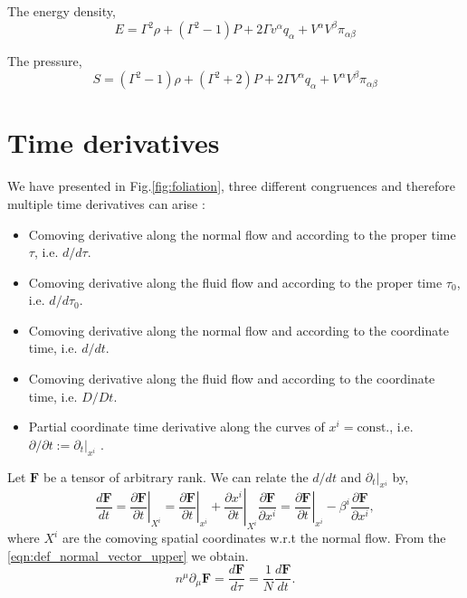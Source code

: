 The energy density,
\begin{equation}
    E=\Gamma^2 \rho + (\Gamma^2-1)P+2\Gamma v^\alpha q_\alpha + V^\alpha V^\beta \pi_{\alpha\beta}
    \label{eqn:general_energy_fluid_normal}
\end{equation}

The pressure,
\begin{equation}
    S=(\Gamma^2-1)\rho + (\Gamma^2+2)P+2\Gamma V^\alpha q_\alpha + V^\alpha V^\beta \pi_{\alpha\beta}
    \label{eqn:general_shear_fluid_normal}
\end{equation}




\section{Time derivatives}


We have presented in Fig.\eqref{fig:foliation}, three different congruences and therefore multiple time derivatives can arise \cite{Buchert_2020}:
\begin{itemize}
    \item Comoving derivative along the normal flow and according to the proper time $\tau$, i.e. $d/d\tau$.
    \item Comoving derivative along the fluid flow and according to the proper time $\tau_0$, i.e. $d/d\tau_0$.
    \item Comoving derivative along the normal flow and according to the coordinate time, i.e. $d/dt$.
    \item Comoving derivative along the fluid flow and according to the coordinate time, i.e. $D/Dt$.
    \item Partial coordinate time derivative along the curves of $x^i=\text{const.}$, i.e. $\partial/\partial t:=\partial_t|_{x^i}$ .
\end{itemize}

Let $\mathbf{F}$ be a tensor of arbitrary rank. We can relate the $d/dt$ and $\partial_t|_{x^i}$ by,
\begin{equation}
    \frac{d\mathbf{F}}{dt}=\left.\frac{\partial \mathbf{F}}{\partial t}\right|_{X^i}=\left.\frac{\partial \mathbf{F}}{\partial t}\right|_{x^i}+\left.\frac{\partial x^i}{\partial t}\right|_{X^i}\frac{\partial \mathbf{F}}{\partial x^i}=\left.\frac{\partial \mathbf{F}}{\partial t}\right|_{x^i}-\beta^i\frac{\partial \mathbf{F}}{\partial x^i},
    \label{eqn:normal_total_time_expression}
\end{equation}
where $X^i$ are the comoving spatial coordinates w.r.t the normal flow. From the \cref{eqn:def_normal_vector_upper} we obtain.
\begin{equation}
    n^\mu\partial_\mu \mathbf{F}=\frac{d\mathbf{F}}{d\tau}=\frac{1}{N}\frac{d\mathbf{F}}{dt}.
    \label{eqn:relation_total_time_normal_vec}
\end{equation}

